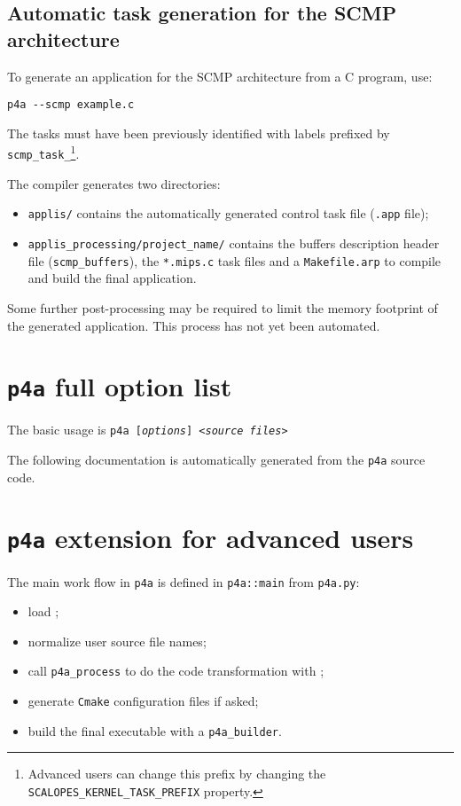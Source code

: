 \documentclass[a4paper]{article}
\begin{document}
\subsection{Automatic task generation for the SCMP architecture}
\label{sec:scmp}

To generate an application for the SCMP architecture from a C program, use:
\begin{verbatim}
p4a --scmp example.c
\end{verbatim}
The tasks must have been previously identified with labels prefixed by
\texttt{scmp\_task\_}\footnote{Advanced users can change this prefix
  by changing the \Apips \texttt{SCALOPES\_KERNEL\_TASK\_PREFIX}
  property.}.

The compiler generates two directories:
\begin{itemize}
\item \texttt{applis/}  contains the automatically generated control task file (\texttt{.app} file);
\item \texttt{applis\_processing/project\_name/} contains the buffers
  description header file (\texttt{scmp\_buffers}), the
  \texttt{*.mips.c} task files and a \texttt{Makefile.arp} to compile
  and build the final application.
\end{itemize}

Some further post-processing may be required to limit the memory
footprint of the generated application. This process has not yet been
automated.

\section{\protect\texttt{p4a} full option list}
\label{sec:options}

The basic usage is \texttt{p4a [\emph{options}] <\emph{source files}>}

The following documentation is automatically generated from the
\texttt{p4a} source code.




\section{\protect\texttt{p4a} extension for advanced users}
\label{sec:p4a-extension}

The main work flow in \texttt{p4a} is
defined in \verb|p4a::main| from \verb|p4a.py|:
\begin{itemize}
\item load \Apyps;
\item normalize user source file names;
\item call \verb|p4a_process| to do the code transformation with \Apyps;
\item generate \texttt{Cmake} configuration files if asked;
\item build the final executable with a \verb|p4a_builder|.
\end{itemize}
\end{document}
